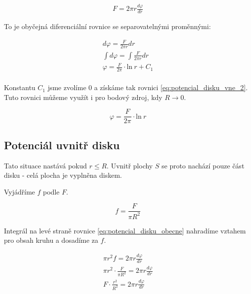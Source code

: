 \documentclass{book}
\begin{document}
\begin{equation}
\label{eq:potencial_disku_vne_0}
\begin{split}
F = 2 \pi r \frac{d \varphi}{dr}
\end{split}
\end{equation}

To je obyčejná diferenciální rovnice se separovatelnými proměnnými:

\begin{equation}
\label{eq:potencial_disku_vne_1}
\begin{split}
d \varphi = \frac{F}{2 \pi r} dr \\
\int d \varphi = \int \frac{F}{2 \pi r} dr \\
\varphi = \frac{F}{2 \pi} \cdot \mathrm{ln} \ r + C_1 \\
\end{split}
\end{equation}

Konstantu \(C_1\) jsme zvolíme 0 a získáme tak rovnici \eqref{eq:potencial_disku_vne_2}. Tuto rovnici můžeme využít i pro bodový zdroj, kdy \(R \rightarrow 0\).

\begin{equation}
\label{eq:potencial_disku_vne_2}
\varphi = \frac{F}{2 \pi} \cdot \mathrm{ln} \ r
\end{equation}

\subsection{Potenciál uvnitř disku}

Tato situace nastává pokud \(r \leq R\). Uvnitř plochy \(S\) se proto nachází pouze část disku - celá plocha je vyplněna diskem.

Vyjádříme \(f\) podle \(F\).

\begin{equation}
f = \frac{F}{\pi R^2}
\end{equation}

Integrál na levé straně rovnice \eqref{eq:potencial_disku_obecne} nahradíme vztahem pro obsah kruhu a dosadíme za \(f\).

\begin{equation}
\begin{split}
\pi r^2 f = 2 \pi r \frac{d \varphi}{dr} \\
\pi r^2 \cdot \frac{F}{\pi R^2} = 2 \pi r \frac{d \varphi}{dr} \\
F \cdot \frac{r^2}{R^2} = 2 \pi r \frac{d \varphi}{dr}
\end{split}
\end{equation}
\end{document}
